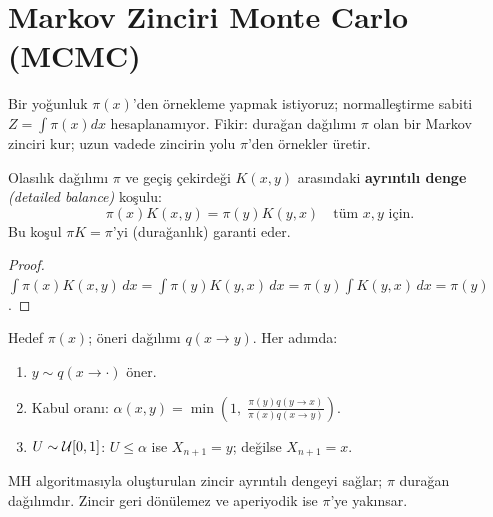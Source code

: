 \section{Markov Zinciri Monte Carlo (MCMC)}
\label{sec:mcmc}

\begin{kesif}
Bir yoğunluk $\pi(x)$'den örnekleme yapmak istiyoruz; normalleştirme sabiti $Z=\int\pi(x)dx$ hesaplanamıyor. Fikir: durağan dağılımı $\pi$ olan bir Markov zinciri kur; uzun vadede zincirin yolu $\pi$'den örnekler üretir.
\end{kesif}

\begin{tanim}\label{def:ayrintili_denge}
Olasılık dağılımı $\pi$ ve geçiş çekirdeği $K(x,y)$ arasındaki \textbf{ayrıntılı denge} \emph{(detailed balance)} koşulu:
\[
  \pi(x)K(x,y) = \pi(y)K(y,x) \quad \text{tüm } x,y \text{ için}.
\]
Bu koşul $\pi K = \pi$'yi (durağanlık) garanti eder.
\end{tanim}

\begin{proof}
$\int\pi(x)K(x,y)\,dx = \int\pi(y)K(y,x)\,dx = \pi(y)\int K(y,x)\,dx = \pi(y)$.
\end{proof}

\begin{tanim}\label{def:metropolis_hastings}
Hedef $\pi(x)$; öneri dağılımı $q(x\to y)$. Her adımda:
\begin{enumerate}
  \item $y\sim q(x\to\cdot)$ öner.
  \item Kabul oranı: $\alpha(x,y) = \min\!\left(1,\;\frac{\pi(y)q(y\to x)}{\pi(x)q(x\to y)}\right)$.
  \item $U\sim\mathcal{U}[0,1]$: $U\leq\alpha$ ise $X_{n+1}=y$; değilse $X_{n+1}=x$.
\end{enumerate}
\end{tanim}

\begin{teorem}\label{thm:mh_gecerlilik}
MH algoritmasıyla oluşturulan zincir ayrıntılı dengeyi sağlar; $\pi$ durağan dağılımdır. Zincir geri dönülemez ve aperiyodik ise $\pi$'ye yakınsar.
\end{teorem}

